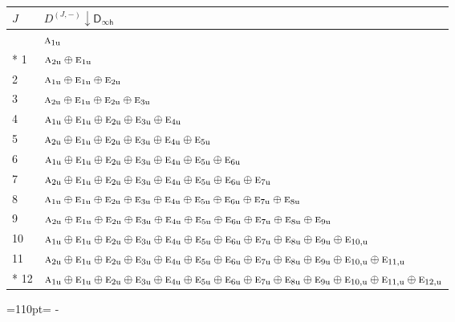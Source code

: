 \documentclass[10pt,a4paper]{article}
\newcommand{\needspace}[1]{\par\penalty-100\begingroup\dimen0=#1\relax\dimen2=\pagegoal
  \advance\dimen2-\pagetotal\ifdim\dimen0>\dimen2\relax\ifdim\dimen2>0pt\vfil\break\fi\fi
  \endgroup}
\numberwithin{equation}{section}
\newcommand{\grp}[1]{\mathsf{#1}}
\newcommand{\irr}[1]{\text{\normalfont\scshape #1}}
\newcommand{\ptag}[1]{\mathrm{#1}}
\newcommand{\restr}[2]{#1\!\downarrow#2}
\newcommand{\irrJp}[2]{D^{(#1,#2)}}
\begin{document}
{\small\begin{longtable}{@{}ll@{}}\toprule
$J$ & $\restr{\irrJp{J}{-}}{\grp{D_{\infty h}}}$\\\midrule\endhead
\bottomrule\endfoot\endlastfoot
0 & $\irr{a}_{1\ptag{u}}$\\*
1 & $\irr{a}_{2\ptag{u}} \oplus \irr{e}_{1\ptag{u}}$\\
2 & $\irr{a}_{1\ptag{u}} \oplus \irr{e}_{1\ptag{u}} \oplus \irr{e}_{2\ptag{u}}$\\
3 & $\irr{a}_{2\ptag{u}} \oplus \irr{e}_{1\ptag{u}} \oplus \irr{e}_{2\ptag{u}} \oplus \irr{e}_{3\ptag{u}}$\\
4 & $\irr{a}_{1\ptag{u}} \oplus \irr{e}_{1\ptag{u}} \oplus \irr{e}_{2\ptag{u}} \oplus \irr{e}_{3\ptag{u}} \oplus \irr{e}_{4\ptag{u}}$\\
5 & $\irr{a}_{2\ptag{u}} \oplus \irr{e}_{1\ptag{u}} \oplus \irr{e}_{2\ptag{u}} \oplus \irr{e}_{3\ptag{u}} \oplus \irr{e}_{4\ptag{u}} \oplus \irr{e}_{5\ptag{u}}$\\
6 & $\irr{a}_{1\ptag{u}} \oplus \irr{e}_{1\ptag{u}} \oplus \irr{e}_{2\ptag{u}} \oplus \irr{e}_{3\ptag{u}} \oplus \irr{e}_{4\ptag{u}} \oplus \irr{e}_{5\ptag{u}} \oplus \irr{e}_{6\ptag{u}}$\\
7 & $\irr{a}_{2\ptag{u}} \oplus \irr{e}_{1\ptag{u}} \oplus \irr{e}_{2\ptag{u}} \oplus \irr{e}_{3\ptag{u}} \oplus \irr{e}_{4\ptag{u}} \oplus \irr{e}_{5\ptag{u}} \oplus \irr{e}_{6\ptag{u}} \oplus \irr{e}_{7\ptag{u}}$\\
8 & $\irr{a}_{1\ptag{u}} \oplus \irr{e}_{1\ptag{u}} \oplus \irr{e}_{2\ptag{u}} \oplus \irr{e}_{3\ptag{u}} \oplus \irr{e}_{4\ptag{u}} \oplus \irr{e}_{5\ptag{u}} \oplus \irr{e}_{6\ptag{u}} \oplus \irr{e}_{7\ptag{u}} \oplus \irr{e}_{8\ptag{u}}$\\
9 & $\irr{a}_{2\ptag{u}} \oplus \irr{e}_{1\ptag{u}} \oplus \irr{e}_{2\ptag{u}} \oplus \irr{e}_{3\ptag{u}} \oplus \irr{e}_{4\ptag{u}} \oplus \irr{e}_{5\ptag{u}} \oplus \irr{e}_{6\ptag{u}} \oplus \irr{e}_{7\ptag{u}} \oplus \irr{e}_{8\ptag{u}} \oplus \irr{e}_{9\ptag{u}}$\\
10 & $\irr{a}_{1\ptag{u}} \oplus \irr{e}_{1\ptag{u}} \oplus \irr{e}_{2\ptag{u}} \oplus \irr{e}_{3\ptag{u}} \oplus \irr{e}_{4\ptag{u}} \oplus \irr{e}_{5\ptag{u}} \oplus \irr{e}_{6\ptag{u}} \oplus \irr{e}_{7\ptag{u}} \oplus \irr{e}_{8\ptag{u}} \oplus \irr{e}_{9\ptag{u}} \oplus \irr{e}_{10,\ptag{u}}$\\
11 & $\irr{a}_{2\ptag{u}} \oplus \irr{e}_{1\ptag{u}} \oplus \irr{e}_{2\ptag{u}} \oplus \irr{e}_{3\ptag{u}} \oplus \irr{e}_{4\ptag{u}} \oplus \irr{e}_{5\ptag{u}} \oplus \irr{e}_{6\ptag{u}} \oplus \irr{e}_{7\ptag{u}} \oplus \irr{e}_{8\ptag{u}} \oplus \irr{e}_{9\ptag{u}} \oplus \irr{e}_{10,\ptag{u}} \oplus \irr{e}_{11,\ptag{u}}$\\*
12 & $\irr{a}_{1\ptag{u}} \oplus \irr{e}_{1\ptag{u}} \oplus \irr{e}_{2\ptag{u}} \oplus \irr{e}_{3\ptag{u}} \oplus \irr{e}_{4\ptag{u}} \oplus \irr{e}_{5\ptag{u}} \oplus \irr{e}_{6\ptag{u}} \oplus \irr{e}_{7\ptag{u}} \oplus \irr{e}_{8\ptag{u}} \oplus \irr{e}_{9\ptag{u}} \oplus \irr{e}_{10,\ptag{u}} \oplus \irr{e}_{11,\ptag{u}} \oplus \irr{e}_{12,\ptag{u}}$\\
\bottomrule\end{longtable}}
\needspace{110pt}
\end{document}
